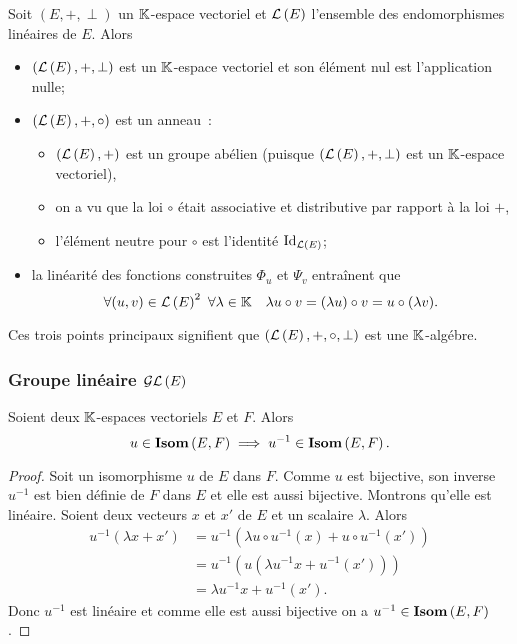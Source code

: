 Soit $(E,+,\perp)$ un $\mathbb{K}$-espace vectoriel et $\mathcal{L}\left(E\right)$ l'ensemble des endomorphismes linéaires de $E$. Alors
\begin{itemize}
\item $(\mathcal{L}\left(E\right),+,\perp)$ est un $\mathbb{K}$-espace vectoriel et son élément nul est l'application nulle;
\item $(\mathcal{L}\left(E\right), +, \circ)$ est un anneau~:
  \begin{itemize}
  \item $(\mathcal{L}\left(E\right),+)$ est un groupe abélien (puisque $(\mathcal{L}\left(E\right),+,\perp)$ est un $\mathbb{K}$-espace vectoriel),
  \item on a vu que la loi $\circ$ était associative et distributive par rapport à la loi $+$,
  \item l'élément neutre pour $\circ$ est l'identité $\operatorname{Id}_{\mathcal{L}\left(E\right)}$;
  \end{itemize}
\item la linéarité des fonctions construites $\Phi_u$ et $\Psi_v$ entraînent que
  \begin{equation}
    \forall (u,v) \in \mathcal{L}\left(E\right)^2 \ \forall \lambda \in \mathbb{K} \quad \lambda u \circ v = (\lambda u) \circ v = u \circ (\lambda v).
  \end{equation}
\end{itemize}

Ces trois points principaux signifient que $(\mathcal{L}\left(E\right),+,\circ, \perp)$ est une $\mathbb{K}$-algébre.

\subsubsection{Groupe linéaire $\mathcal{GL}\left(E\right)$}

\begin{theo}
  Soient deux $\mathbb{K}$-espaces vectoriels $E$ et $F$. Alors
  \begin{equation}
    u \in \mathbf{Isom}\left(E,F\right) \implies u^{-1} \in \mathbf{Isom}\left(E,F\right).
  \end{equation}
\end{theo}
\begin{proof}
  Soit un isomorphisme $u$ de $E$ dans $F$. Comme $u$ est bijective, son inverse $u^{-1}$ est bien définie de $F$ dans $E$ et elle est aussi bijective. Montrons qu'elle est linéaire. Soient deux vecteurs $x$ et $x'$ de $E$ et un scalaire $\lambda$. Alors
  \begin{align}
    u^{-1}(\lambda x+x') &= u^{-1}(\lambda u\circ u^{-1} (x) + u \circ u^{-1}(x')) \\
    &=u^{-1}(u(\lambda u^{-1} x +u^{-1}(x'))) \\
    &=\lambda u^{-1} x +u^{-1}(x').
  \end{align}
  Donc $u^{-1}$ est linéaire et comme elle est aussi bijective on a $u^{-1} \in \mathbf{Isom}\left(E,F\right)$.
\end{proof}

